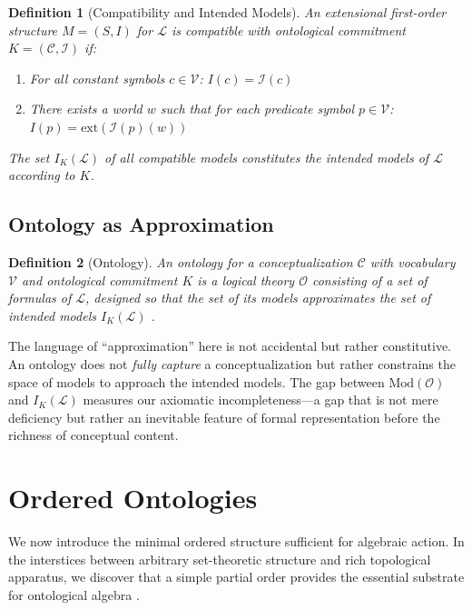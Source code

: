 \documentclass[12pt,a4paper]{article}
\newtheorem{definition}{Definition}[section]
\newcommand{\vocab}{\mathcal{V}}
\newcommand{\lang}{\mathcal{L}}
\newcommand{\interp}{\mathcal{I}}
\newcommand{\concept}{\mathcal{C}}
\newcommand{\onto}{\mathcal{O}}
\begin{document}
\begin{definition}[Compatibility and Intended Models]
An extensional first-order structure $M = (S, I)$ for $\lang$ is \emph{compatible with} ontological commitment $K = (\concept, \interp)$ if:
\begin{enumerate}
    \item For all constant symbols $c \in \vocab$: $I(c) = \interp(c)$
    \item There exists a world $w$ such that for each predicate symbol $p \in \vocab$: $I(p) = \mathrm{ext}(\interp(p)(w))$
\end{enumerate}
The set $I_K(\lang)$ of all compatible models constitutes the \emph{intended models of $\lang$ according to $K$}.
\end{definition}

\subsection{Ontology as Approximation}

\begin{definition}[Ontology]
An \emph{ontology} for a conceptualization $\concept$ with vocabulary $\vocab$ and ontological commitment $K$ is a logical theory $\onto$ consisting of a set of formulas of $\lang$, designed so that the set of its models approximates the set of intended models $I_K(\lang)$ \citep{gruber1993, guarino1998}.
\end{definition}

The language of ``approximation'' here is not accidental but rather constitutive. An ontology does not \emph{fully capture} a conceptualization but rather constrains the space of models to approach the intended models. The gap between $\text{Mod}(\onto)$ and $I_K(\lang)$ measures our axiomatic incompleteness---a gap that is not mere deficiency but rather an inevitable feature of formal representation before the richness of conceptual content.

\section{Ordered Ontologies}

We now introduce the minimal ordered structure sufficient for algebraic action. In the interstices between arbitrary set-theoretic structure and rich topological apparatus, we discover that a simple partial order provides the essential substrate for ontological algebra \citep[for foundational material on order theory, see][]{davey2002}.
\end{document}
